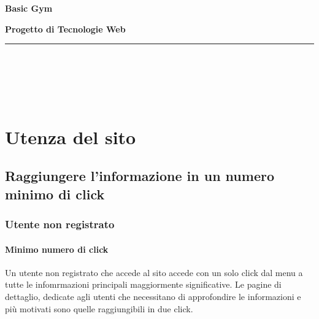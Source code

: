 \documentclass[12pt,a4paper]{article}
\title{\titoloDocumento}
\author{Anna Bonaldo}
\newcommand{\titoloDocumento}{Basic Gym}
\begin{document}
\begin{center}
	\[  \]
	\[  \]
	\[  \]
	\[  \]
	\[  \]

	\vspace{1cm}
	\begin{Huge}
		\textbf{{\titoloDocumento}}\\
		\vspace{0.5cm}
	\end{Huge}
	\begin{Large}
		\textbf{Progetto di Tecnologie Web}\\
		
	\end{Large}
	\vspace{1cm}

 \hrule
 \vspace{1cm}
	\LBmat{} \\
	\TFmat{}\\
     \ABmat{}\\
     \ECmat{}\\
    \vspace{1cm}
   

\end{center}
\newpage
\vspace{1cm}



\begin{abstract}

\end{abstract}
	\newpage
	\tableofcontents
	
	\newpage
\section{Utenza del sito}
\subsection{Raggiungere l'informazione in un numero minimo di click}
\subsubsection{Utente non registrato}
\paragraph{Minimo numero di click}Un utente non registrato che accede al sito accede con un solo click dal menu a tutte le infomrmazioni principali maggiormente significative.
Le pagine di dettaglio, dedicate agli utenti che necessitano di approfondire le informazioni e più motivati sono quelle raggiungibili in due click. 
\end{document}
